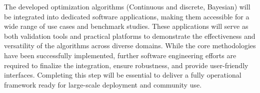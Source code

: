 The developed optimization algorithms (Continuous and discrete, Bayesian) will be integrated into dedicated software applications, making them accessible for a wide range of use cases and benchmark studies. These applications will serve as both validation tools and practical platforms to demonstrate the effectiveness and versatility of the algorithms across diverse domains. While the core methodologies have been successfully implemented, further software engineering efforts are required to finalize the integration, ensure robustness, and provide user-friendly interfaces. Completing this step will be essential to deliver a fully operational framework ready for large-scale deployment and community use.

